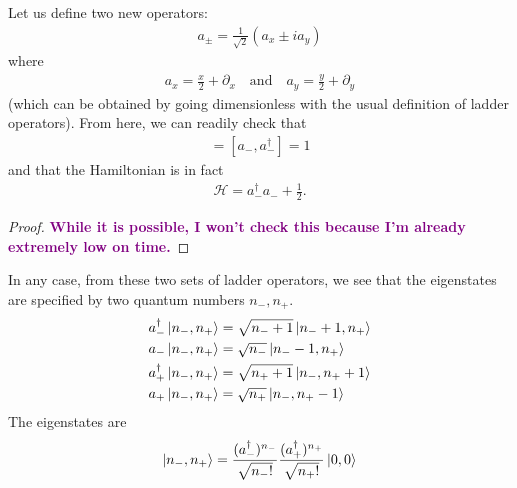 \documentclass{article}
\theoremstyle{definition}
\newcommand{\p}{\partial}
\newcommand{\ham}{\mathcal{H}}
\newcommand{\f}[2]{\frac{#1}{#2}}
\begin{document}
\begin{enumerate}[label=(\alph*)]
	Let us define two new operators:
	\begin{align*}
	a_{\pm} = \f{1}{\sqrt{2}}(a_x \pm i a_y)
	\end{align*}
	where
	\begin{align*}
	a_x = \f{x}{2} + \p_x \quad\text{and}\quad a_y = \f{y}{2} + \p_y
	\end{align*}
	(which can be obtained by going dimensionless with the usual definition of ladder operators). From here, we can readily check that 
	\begin{align*}
	[a_+, a_+^\dagger] = [a_-,a_-^\dagger]  =1
	\end{align*}
	and that the Hamiltonian is in fact
	\begin{align*}
	\ham = a_-^\dagger a_- + \f{1}{2}.
	\end{align*}
	\begin{proof}
		\textbf{\textcolor{purple}{While it is possible, I won't check this because I'm already extremely low on time.}}
	\end{proof}
	In any case, from these two sets of ladder operators, we see that the eigenstates are specified by two quantum numbers $n_-, n_+$.
	\begin{align*}
	&a_-^\dagger\ket{n_-, n_+} = \sqrt{n_-+1} \ket{n_-+1,n_+} \\
	&a_-\ket{n_-, n_+} = \sqrt{n_-} \ket{n_--1,n_+} \\
	&a_+^\dagger\ket{n_-, n_+} = \sqrt{n_++1} \ket{n_-,n_++1} \\
	&a_+ \ket{n_-, n_+} = \sqrt{n_+} \ket{n_-,n_+-1}  
	\end{align*}
	The eigenstates are
	\begin{align*}
	\ket{n_-,n_+} = \f{(a_-^\dagger)^{n_-}}{\sqrt{n_-!}}\f{(a_+^\dagger)^{n_+}}{\sqrt{n_+!}}\ket{0,0}
	\end{align*}


\end{enumerate}
\end{document}
